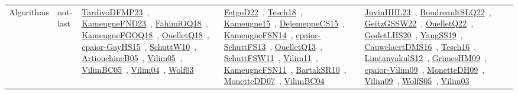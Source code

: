 {\begin{longtable}{lp{3cm}>{\raggedright\arraybackslash}p{6cm}>{\raggedright\arraybackslash}p{6cm}>{\raggedright\arraybackslash}p{8cm}}
Algorithms & not-last & \href{papers/TardivoDFMP23.pdf}{TardivoDFMP23}~\cite{TardivoDFMP23}, \href{papers/KameugneFND23.pdf}{KameugneFND23}~\cite{KameugneFND23}, \href{articles/FahimiOQ18.pdf}{FahimiOQ18}~\cite{FahimiOQ18}, \href{papers/KameugneFGOQ18.pdf}{KameugneFGOQ18}~\cite{KameugneFGOQ18}, \href{papers/OuelletQ18.pdf}{OuelletQ18}~\cite{OuelletQ18}, \href{papers/cpaior-GayHS15.pdf}{cpaior-GayHS15}~\cite{cpaior-GayHS15}, \href{papers/SchuttW10.pdf}{SchuttW10}~\cite{SchuttW10}, \href{papers/ArtiouchineB05.pdf}{ArtiouchineB05}~\cite{ArtiouchineB05}, \href{papers/Vilim05.pdf}{Vilim05}~\cite{Vilim05}, \href{articles/VilimBC05.pdf}{VilimBC05}~\cite{VilimBC05}, \href{papers/Vilim04.pdf}{Vilim04}~\cite{Vilim04}, \href{papers/Wolf03.pdf}{Wolf03}~\cite{Wolf03} & \href{articles/FetgoD22.pdf}{FetgoD22}~\cite{FetgoD22}, \href{papers/Tesch18.pdf}{Tesch18}~\cite{Tesch18}, \href{articles/Kameugne15.pdf}{Kameugne15}~\cite{Kameugne15}, \href{papers/DejemeppeCS15.pdf}{DejemeppeCS15}~\cite{DejemeppeCS15}, \href{articles/KameugneFSN14.pdf}{KameugneFSN14}~\cite{KameugneFSN14}, \href{papers/cpaior-SchuttFS13.pdf}{cpaior-SchuttFS13}~\cite{cpaior-SchuttFS13}, \href{papers/OuelletQ13.pdf}{OuelletQ13}~\cite{OuelletQ13}, \href{articles/SchuttFSW11.pdf}{SchuttFSW11}~\cite{SchuttFSW11}, \href{papers/Vilim11.pdf}{Vilim11}~\cite{Vilim11}, \href{papers/KameugneFSN11.pdf}{KameugneFSN11}~\cite{KameugneFSN11}, \href{articles/BartakSR10.pdf}{BartakSR10}~\cite{BartakSR10}, \href{papers/MonetteDD07.pdf}{MonetteDD07}~\cite{MonetteDD07}, \href{papers/VilimBC04.pdf}{VilimBC04}~\cite{VilimBC04} & \href{papers/JuvinHHL23.pdf}{JuvinHHL23}~\cite{JuvinHHL23}, \href{papers/BoudreaultSLQ22.pdf}{BoudreaultSLQ22}~\cite{BoudreaultSLQ22}, \href{papers/GeitzGSSW22.pdf}{GeitzGSSW22}~\cite{GeitzGSSW22}, \href{papers/OuelletQ22.pdf}{OuelletQ22}~\cite{OuelletQ22}, \href{papers/GodetLHS20.pdf}{GodetLHS20}~\cite{GodetLHS20}, \href{papers/YangSS19.pdf}{YangSS19}~\cite{YangSS19}, \href{papers/CauwelaertDMS16.pdf}{CauwelaertDMS16}~\cite{CauwelaertDMS16}, \href{papers/Tesch16.pdf}{Tesch16}~\cite{Tesch16}, \href{articles/LimtanyakulS12.pdf}{LimtanyakulS12}~\cite{LimtanyakulS12}, \href{papers/GrimesHM09.pdf}{GrimesHM09}~\cite{GrimesHM09}, \href{papers/cpaior-Vilim09.pdf}{cpaior-Vilim09}~\cite{cpaior-Vilim09}, \href{papers/MonetteDH09.pdf}{MonetteDH09}~\cite{MonetteDH09}, \href{papers/Vilim09.pdf}{Vilim09}~\cite{Vilim09}, \href{papers/WolfS05.pdf}{WolfS05}~\cite{WolfS05}, \href{papers/Vilim03.pdf}{Vilim03}~\cite{Vilim03}\\

\end{longtable}}
